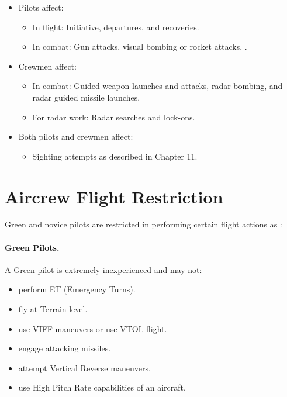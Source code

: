 \begin{advancedrules}
\begin{itemize}
\item Pilots affect:
\begin{itemize}
    \item In flight: Initiative, departures, and recoveries.
    \item In combat: Gun attacks, visual bombing or rocket attacks, .
\end{itemize}

\item Crewmen affect:
\begin{itemize}
    \item In combat: Guided weapon launches and attacks, radar bombing, and radar guided missile launches.
    \item For radar work:  Radar searches and lock-ons.
\end{itemize}

\item Both pilots and crewmen affect:
\begin{itemize}
    \item Sighting attempts as described in Chapter 11.
\end{itemize}
\end{itemize}

\section{Aircrew Flight Restriction}


Green and novice pilots are restricted in performing certain flight actions as :

\paragraph{Green Pilots.} A Green pilot is extremely inexperienced and may not:
\begin{itemize}
    \item perform ET (Emergency Turns).
    \item fly at Terrain level.
    \item use VIFF maneuvers or use VTOL flight.
    \item engage attacking missiles.
    \item attempt Vertical Reverse maneuvers.
    \item use High Pitch Rate capabilities of an aircraft. 
\end{itemize}


\end{advancedrules}
